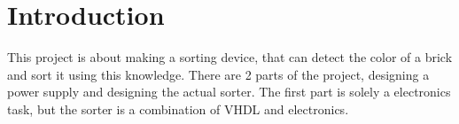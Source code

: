 \section{Introduction}
This project is about making a sorting device, that can detect the color of a brick and sort it using this knowledge. There are 2 parts of the project, designing a power supply and designing the actual sorter. The first part is solely a electronics task, but the sorter is a combination of VHDL and electronics. 